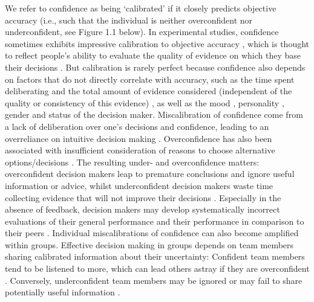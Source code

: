 \documentclass[a4paper, nobind]{templates/ociamthesis}
\begin{document}
\hfill\break
We refer to confidence as being `calibrated' if it closely predicts objective accuracy (i.e., such that the individual is neither overconfident nor underconfident, see Figure 1.1 below). In experimental studies, confidence sometimes exhibits impressive calibration to objective accuracy \autocite{boldt_shared_2015}, which is thought to reflect people's ability to evaluate the quality of evidence on which they base their decisions \autocite{xue_challenging_2023}. But calibration is rarely perfect because confidence also depends on factors that do not directly correlate with accuracy, such as the time spent deliberating and the total amount of evidence considered (independent of the quality or consistency of this evidence) \autocite{kiani_choice_2014}, as well as the mood \autocite{rouault_psychiatric_2018}, personality \autocite{schaefer_overconfidence_2004}, gender \autocite{syzmanowicz_gender_2011} and status \autocite{see_detrimental_2011} of the decision maker. Miscalibration of confidence come from a lack of deliberation over one's decisions and confidence, leading to an overreliance on intuitive decision making \autocite{mata_metacognitive_2013}. Overconfidence has also been associated with insufficient consideration of reasons to choose alternative options/decisions \autocite{koriat_reasons_1980,scherer_trust_2015}. The resulting under- and overconfidence matters: overconfident decision makers leap to premature conclusions and ignore useful information or advice, whilst underconfident decision makers waste time collecting evidence that will not improve their decisions \autocite{desender_subjective_2018}. Especially in the absence of feedback, decision makers may develop systematically incorrect evaluations of their general performance \autocite{rouault_forming_2019} and their performance in comparison to their peers \autocite{kruger_unskilled_1999}. Individual miscalibrations of confidence can also become amplified within groups. Effective decision making in groups depends on team members sharing calibrated information about their uncertainty: Confident team members tend to be listened to more, which can lead others astray if they are overconfident \autocite{zarnoth_social_1997}. Conversely, underconfident team members may be ignored or may fail to share potentially useful information \autocite{silver_wise_2021}.

\newpage
\end{document}
